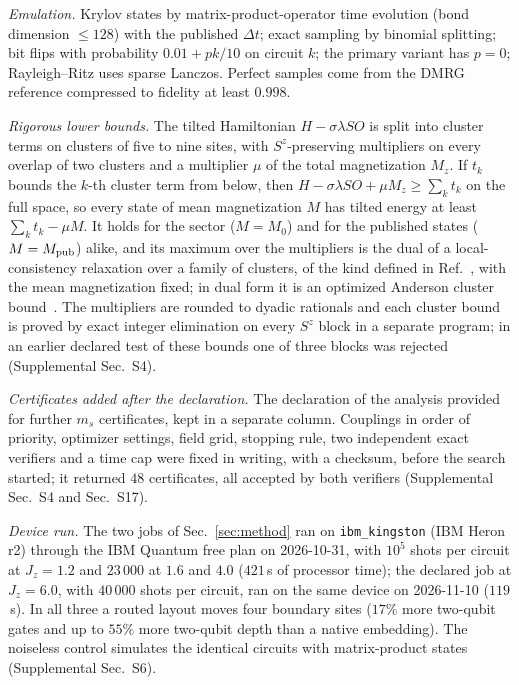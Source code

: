 \documentclass[aps,prx,twocolumn,10pt,superscriptaddress,nofootinbib,longbibliography,floatfix]{revtex4-2}
\theoremstyle{remark}
\newcommand{\Jz}{J_z}
\newcommand{\ms}{m_s}
\begin{document}
\emph{Emulation.} Krylov states by matrix-product-operator time evolution (bond dimension $\le128$) with the %
published $\Delta t$; exact sampling by binomial splitting; bit flips with probability $0.01+pk/10$ on circuit $k$; %
the primary variant has $p=0$; Rayleigh--Ritz uses sparse Lanczos. Perfect samples come from the DMRG reference %
compressed to fidelity at least $0.998$. %

\emph{Rigorous lower bounds.} The tilted Hamiltonian $H-\sigma\lambda SO$ is split into cluster terms on clusters of
five to nine sites, with $S^z$-preserving multipliers on every overlap of two clusters and a multiplier $\mu$ of the
total magnetization $M_z$. If $t_k$ bounds the $k$-th cluster term from below, then
$H-\sigma\lambda SO+\mu M_z\ge\sum_kt_k$ on the full space, so every state of mean magnetization $M$ has tilted
energy at least $\sum_kt_k-\mu M$. It
holds for the sector ($M=M_0$) and for the published states ($M=M_{\rm pub}$) alike, and its maximum over the
multipliers is the dual of a local-consistency relaxation over a family of clusters, of the kind defined in
Ref.~\cite{lin2026}, with the mean magnetization fixed; in dual form it is an optimized Anderson cluster
bound~\cite{anderson1951}. The multipliers are rounded to dyadic rationals and
each cluster bound is proved by exact integer elimination on every $S^z$ block in a separate program; in an
earlier declared test of these bounds one of three blocks was rejected (Supplemental Sec.~S4).

\emph{Certificates added after the declaration.} The declaration of the analysis provided for further $\ms$
certificates, kept in a separate column. Couplings in order of priority, optimizer settings, field grid, stopping
rule, two independent exact verifiers and a time cap were fixed in writing, with a checksum, before the search
started; it returned $48$ certificates, all accepted by both verifiers (Supplemental Sec.~S4 and Sec.~S17). %

\emph{Device run.} The two jobs of Sec.~\ref{sec:method} ran on \texttt{ibm\_kingston} (IBM Heron r2) through the IBM
Quantum free plan on 2026-10-31, with $10^5$ shots per circuit at $\Jz=1.2$ and $23\,000$ at $1.6$ and $4.0$ ($421$\,s %
of processor time); the declared job at $\Jz=6.0$, with $40\,000$ shots per circuit, ran on the same device on %
2026-11-10 ($119$\,s). In all three a routed layout moves four boundary sites ($17\%$ more two-qubit gates and up to $55\%$ more two-qubit depth than a native embedding). %
The noiseless control simulates the identical circuits with matrix-product states (Supplemental Sec.~S6).
\end{document}
